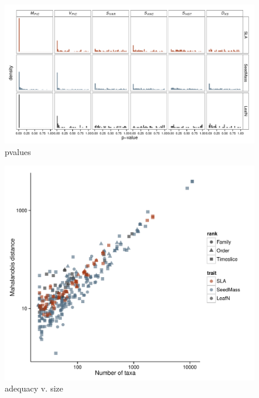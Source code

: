\documentclass[a4paper,12pt]{article}
\begin{document}
\begin{figure}[p]
  \centering
  \includegraphics{figs/pvalue-hist-ML}
  \caption{pvalues}
  \label{fig:pvalues}
\end{figure}

\begin{figure}[p]
  \centering
  \includegraphics[scale=0.9]{figs/Size-adequacy-ML-bestonly}
  \caption{adequacy v. size}
  \label{fig:size-adequacy}
\end{figure}
\end{document}
